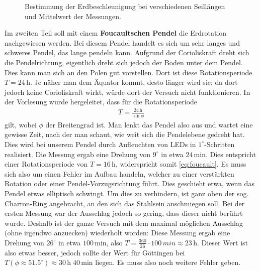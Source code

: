\documentclass[12pt,a4paper,headinclude,bibtotoc]{scrartcl}
\begin{document}
\begin{figure}[!htb]
	\centering	
	\begin{minipage}{0.65\textwidth}	
		\resizebox{\textwidth}{!}{   		
   		}
   		\caption{Bestimmung der Erdbeschleunigung bei verschiedenen Seillängen und Mittelwert der Messungen.}
   		\label{fig:gbesch}
   \end{minipage}   
\end{figure}

Im zweiten Teil soll mit einem \textbf{Foucaultschen Pendel} die Erdrotation nachgewiesen werden.
Bei diesem Pendel handelt es sich um sehr langes und schweres Pendel, das lange pendeln kann.
Aufgrund der Corioliskraft dreht sich die Pendelrichtung, eigentlich dreht sich jedoch der Boden unter dem Pendel.
Dies kann man sich an den Polen gut vorstellen.
Dort ist diese Rotationsperiode $T=24\,$h.
Je näher man dem Äquator kommt, desto länger wird sie; da dort jedoch keine Corioliskraft wirkt, würde dort der Versuch nicht funktionieren.
In der Vorlesung wurde hergeleitet, dass für die Rotationsperiode 
\begin{align}
	T=\frac{24\,\si{\hour}}{\sin\phi}
	\label{eq:foucault}
\end{align}
gilt, wobei $\phi$ der Breitengrad ist.
Man lenkt das Pendel also aus und wartet eine gewisse Zeit, nach der man schaut, wie weit sich die Pendelebene gedreht hat.
Dies wird bei unserem Pendel durch Aufleuchten von LEDs in $1^\circ$-Schritten realisiert.
Die Messung ergab eine Drehung von $9^\circ$ in etwa $24\,$min.
Dies entspricht einer Rotationsperiode von $T=16\,$h, widerspricht somit \eqref{eq:foucault}.
Es muss sich also um einen Fehler im Aufbau handeln, welcher zu einer verstärkten Rotation oder einer Pendel-Vorzugsrichtung führt.
Dies geschieht etwa, wenn das Pendel etwas elliptisch schwingt.
Um dies zu verhindern, ist ganz oben der sog. Charron-Ring angebracht, an den sich das Stahlsein anschmiegen soll.
Bei der ersten Messung war der Ausschlag jedoch so gering, dass dieser nicht berührt wurde.
Deshalb ist der ganze Versuch mit dem maximal möglichen Ausschlag (ohne irgendwo anzuecken) wiederholt worden:
Diese Messung ergab eine Drehung von $26^\circ$ in etwa $100\,$min, also $T=\frac{360}{26}\cdot 100\,\si{min}\approx23\,$h.
Dieser Wert ist also etwas besser, jedoch sollte der Wert für Göttingen bei $T(\phi\approx 51.5^\circ)\approx30\,\si{\hour} \;40\,\si{\minute}$ liegen.
Es muss also noch weitere Fehler geben.
\end{document}
